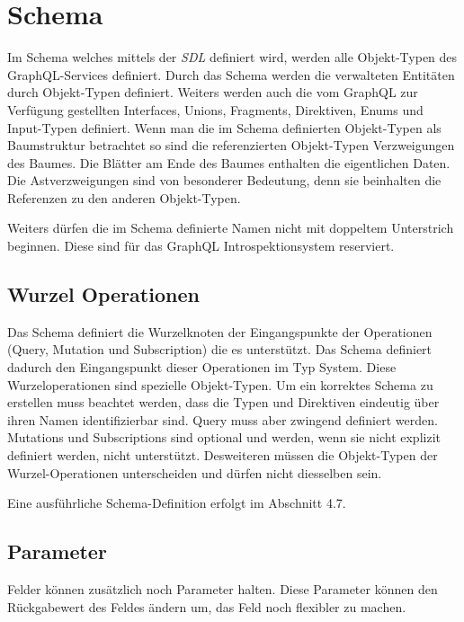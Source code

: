 \section{Schema}\label{test}
Im Schema welches mittels der \textit{SDL} definiert wird, werden alle Objekt-Typen des GraphQL-Services definiert.
Durch das Schema werden die verwalteten Entitäten durch Objekt-Typen definiert.
Weiters werden auch die vom GraphQL zur Verfügung gestellten Interfaces, Unions, Fragments, Direktiven, Enums und Input-Typen definiert.
Wenn man die im Schema definierten Objekt-Typen als Baumstruktur betrachtet so sind die referenzierten Objekt-Typen Verzweigungen des Baumes.
Die Blätter am Ende des Baumes enthalten die eigentlichen Daten.
Die Astverzweigungen sind von besonderer Bedeutung, denn sie beinhalten die Referenzen zu den anderen Objekt-Typen.
\cite[S.60]{kress2020graphql}

Weiters dürfen die im Schema definierte Namen nicht mit doppeltem Unterstrich beginnen.
Diese sind für das GraphQL Introspektionsystem reserviert.
\cite[Abs. 3.3]{graphqlOnline}

\subsection{Wurzel Operationen}
Das Schema definiert die Wurzelknoten der Eingangspunkte der Operationen (Query, Mutation und Subscription) die es unterstützt.
Das Schema definiert dadurch den Eingangspunkt dieser Operationen im Typ System.
Diese Wurzeloperationen sind spezielle Objekt-Typen.
Um ein korrektes Schema zu erstellen muss beachtet werden, dass die Typen und Direktiven eindeutig über ihren Namen identifizierbar sind.
Query muss aber zwingend definiert werden. Mutations und Subscriptions sind optional und werden, wenn sie nicht explizit definiert werden, nicht unterstützt.
Desweiteren müssen die Objekt-Typen der Wurzel-Operationen unterscheiden und dürfen nicht diesselben sein. 
\newline

Eine ausführliche Schema-Definition erfolgt im Abschnitt 4.7.

\subsection{Parameter}
Felder können zusätzlich noch Parameter halten.
Diese Parameter können den Rückgabewert des Feldes ändern um, das Feld noch flexibler zu machen.
\newline

